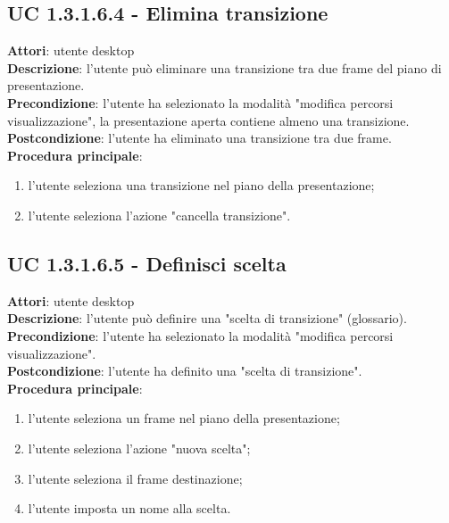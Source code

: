 \subsection{UC 1.3.1.6.4 - Elimina transizione}{
	\label{uc1.3.1.6.4}
	\textbf{Attori}: utente desktop \\
	\textbf{Descrizione}: l'utente può eliminare una transizione tra due frame del piano di presentazione. \\
	\textbf{Precondizione}: l'utente ha selezionato la modalità "modifica percorsi visualizzazione", la presentazione aperta contiene almeno una transizione.	\\
	\textbf{Postcondizione}: l'utente ha eliminato una transizione tra due frame.	\\
	\textbf{Procedura principale}:
	\begin{enumerate}
		\item l'utente seleziona una transizione nel piano della presentazione;
		\item l'utente seleziona l'azione "cancella transizione".
	\end{enumerate}
}
\subsection{UC 1.3.1.6.5 - Definisci scelta}{
	\label{uc1.3.1.6.5}
	\textbf{Attori}: utente desktop \\
	\textbf{Descrizione}: l'utente può definire una "scelta di transizione" (glossario). \\
	\textbf{Precondizione}: l'utente ha selezionato la modalità "modifica percorsi visualizzazione".	\\
	\textbf{Postcondizione}: l'utente ha definito una "scelta di transizione".	\\
	\textbf{Procedura principale}:
	\begin{enumerate}
		\item l'utente seleziona un frame nel piano della presentazione;
		\item l'utente seleziona l'azione "nuova scelta";
		\item l'utente seleziona il frame destinazione;
		\item l'utente imposta un nome alla scelta.
	\end{enumerate}
}
